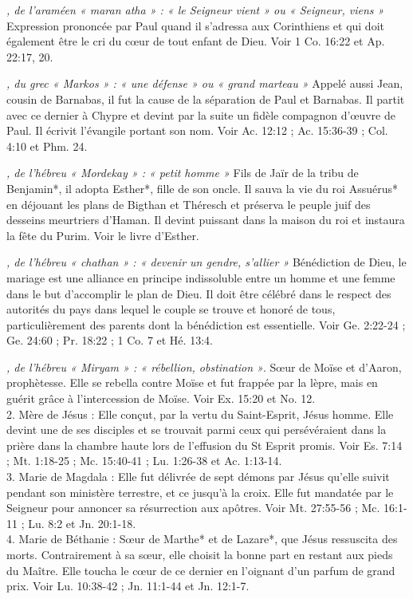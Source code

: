 \begin{multicols}{2}
\textit{, de l'araméen « maran atha » : « le Seigneur vient » ou « Seigneur, viens »}\newline
Expression prononcée par Paul quand il s'adressa aux Corinthiens et qui doit également être le cri du cœur de tout enfant de Dieu. Voir 1 Co. 16:22 et Ap. 22:17, 20.

\textit{, du grec « Markos » : « une défense » ou « grand marteau »}\newline
Appelé aussi Jean, cousin de Barnabas, il fut la cause de la séparation de Paul et Barnabas. Il partit avec ce dernier à Chypre et devint par la suite un fidèle compagnon d'œuvre de Paul. Il écrivit l'évangile portant son nom. Voir Ac. 12:12 ; Ac. 15:36-39 ; Col. 4:10 et Phm. 24.

\textit{, de l'hébreu « Mordekay » : « petit homme »}\newline
Fils de Jaïr de la tribu de Benjamin*, il adopta Esther*, fille de son oncle. Il sauva la vie du roi Assuérus* en déjouant les plans de Bigthan et Théresch et préserva le peuple juif des desseins meurtriers d'Haman. Il devint puissant dans la maison du roi et instaura la fête du Purim. Voir le livre d'Esther.

\textit{, de l'hébreu « chathan » : « devenir un gendre, s'allier »}\newline
Bénédiction de Dieu, le mariage est une alliance en principe indissoluble entre un homme et une femme dans le but d'accomplir le plan de Dieu. Il doit être célébré dans le respect des autorités du pays dans lequel le couple se trouve et honoré de tous, particulièrement des parents dont la bénédiction est essentielle. Voir Ge. 2:22-24 ; Ge. 24:60 ; Pr. 18:22 ; 1 Co. 7 et Hé. 13:4.

\textit{, de l'hébreu « Miryam » : « rébellion, obstination »}. Sœur de Moïse et d'Aaron, prophètesse. Elle se rebella contre Moïse et fut frappée par la lèpre, mais en guérit grâce à l'intercession de Moïse. Voir Ex. 15:20 et No. 12.
\\2. Mère de Jésus : Elle conçut, par la vertu du Saint-Esprit, Jésus homme. Elle devint une de ses disciples et se trouvait parmi ceux qui persévéraient dans la prière dans la chambre haute lors de l'effusion du St Esprit promis. Voir Es. 7:14 ; Mt. 1:18-25 ; Mc. 15:40-41 ; Lu. 1:26-38 et Ac. 1:13-14.
\\3. Marie de Magdala : Elle fut délivrée de sept démons par Jésus qu'elle suivit pendant son ministère terrestre, et ce jusqu'à la croix. Elle fut mandatée par le Seigneur pour annoncer sa résurrection aux apôtres. Voir Mt. 27:55-56 ; Mc. 16:1-11 ; Lu. 8:2 et Jn. 20:1-18.
\\4. Marie de Béthanie : Sœur de Marthe* et de Lazare*, que Jésus ressuscita des morts. Contrairement à sa sœur, elle choisit la bonne part en restant aux pieds du Maître. Elle toucha le cœur de ce dernier en l'oignant d'un parfum de grand prix. Voir  Lu. 10:38-42 ; Jn. 11:1-44 et Jn. 12:1-7.


\end{multicols}
